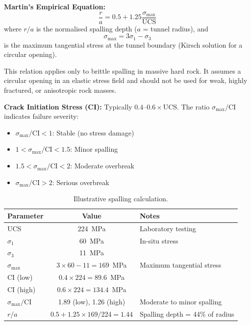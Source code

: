 \textbf{Martin's Empirical Equation:}
\[
\boxed{\frac{r}{a} = 0.5 + 1.25 \frac{\sigma_{\max}}{\mathrm{UCS}}}
\]
where $r/a$ is the normalised spalling depth ($a$ = tunnel radius), and
\[
\sigma_{\max} = 3\sigma_1 - \sigma_3
\]
is the maximum tangential stress at the tunnel boundary (Kirsch solution for a circular opening).

\begin{warnbox}
This relation applies only to brittle spalling in massive hard rock. It assumes a circular opening in an elastic stress field and should not be used for weak, highly fractured, or anisotropic rock masses.
\end{warnbox}

\textbf{Crack Initiation Stress (CI):} Typically $0.4$--$0.6 \times \mathrm{UCS}$. The ratio $\sigma_{\max}/\mathrm{CI}$ indicates failure severity:
\begin{itemize}
 \item $\sigma_{\max}/\mathrm{CI} < 1$: Stable (no stress damage)
 \item $1 < \sigma_{\max}/\mathrm{CI} < 1.5$: Minor spalling
 \item $1.5 < \sigma_{\max}/\mathrm{CI} < 2$: Moderate overbreak
 \item $\sigma_{\max}/\mathrm{CI} > 2$: Serious overbreak
\end{itemize}

\begin{table}[ht]
\centering
\begin{tabular}{lcl}
\toprule
\textbf{Parameter} & \textbf{Value} & \textbf{Notes} \\
\midrule
UCS & 224~MPa & Laboratory testing \\
$\sigma_1$ & 60~MPa & In-situ stress \\
$\sigma_3$ & 11~MPa & \\
$\sigma_{\max}$ & $3\times 60 - 11 = 169$~MPa & Maximum tangential stress \\
CI (low) & $0.4\times224 = 89.6$~MPa & \\
CI (high) & $0.6\times224 = 134.4$~MPa & \\
$\sigma_{\max}/\mathrm{CI}$ & 1.89 (low), 1.26 (high) & Moderate to minor spalling \\
$r/a$ & $0.5 + 1.25\times169/224 = 1.44$ & Spalling depth = 44\% of radius \\
\bottomrule
\end{tabular}
\caption{Illustrative spalling calculation.}
\end{table}

